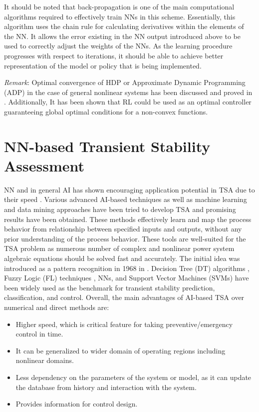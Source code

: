 \documentclass[journal]{IEEEtran}
\begin{document}
It should be noted that back-propagation is one of the main computational algorithms required to effectively train NNs in this scheme. Essentially, this algorithm uses the chain rule for calculating derivatives within the elements of the NN. It allows the error existing in the NN output introduced above to be used to correctly adjust the weights of the NNs. As the learning procedure progresses with respect to iterations, it should be able to achieve better representation of the model or policy that is being implemented.

\textit{ Remark}: Optimal convergence of HDP or Approximate Dynamic Programming (ADP) in the case of general nonlinear systems has been discussed and proved in \cite{al2008discrete}. Additionally, It has been shown \cite{Heyd} that RL could be used as an optimal controller guaranteeing global optimal conditions for a non-convex functions.



\section{NN-based Transient Stability Assessment}
NN and in general AI has shown encouraging application potential in TSA due to their speed \cite{5993876}. Various advanced AI-based techniques as well as machine learning and data mining approaches have been tried to develop TSA and promising results have been obtained. These methods effectively learn and map the process behavior from relationship between specified inputs and outputs, without any prior understanding of the process behavior. These tools are well-suited for the TSA problem as numerous number of complex and nonlinear power system algebraic equations should be solved fast and accurately. The initial idea was introduced as a pattern recognition in 1968 in \cite{595291}. Decision Tree (DT) algorithms \cite{4282006}, Fuzzy Logic (FL) techniques \cite{932291}, NNs, and Support Vector Machines (SVMs) \cite{4282006} have been widely used as the benchmark for transient stability prediction, classification, and control. Overall, the main advantages of AI-based TSA over numerical and direct methods are:
\begin{itemize}
\item Higher speed, which is critical feature for taking preventive/emergency control in time.
\item It can be generalized to wider domain of operating regions including nonlinear domains.
\item Less dependency on the parameters of the system or model, as it can update the database from history and interaction with the system.
\item Provides information for control design.
\end{itemize}
\end{document}
